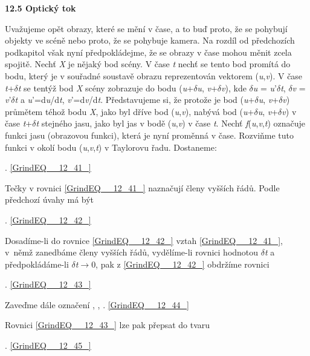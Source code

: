 \noindent 

\noindent \textbf{12.5  Optický tok}

\noindent Uvažujeme opět obrazy, které se mění v čase, a to buď proto, že se pohybují objekty ve scéně nebo proto, že se pohybuje kamera. Na rozdíl od předchozích podkapitol však nyní předpokládejme, že se obrazy v čase mohou měnit zcela spojitě. Nechť \textit{X} je nějaký bod scény. V čase \textit{t} nechť se tento bod promítá do bodu, který je v souřadné soustavě obrazu reprezentován vektorem (\textit{u},\textit{v}). V čase \textit{t}+$\delta$\textit{t} se tentýž bod \textit{X} scény zobrazuje do bodu (\textit{u}+$\delta$\textit{u}, \textit{v}+$\delta$\textit{v}), kde $\delta$\textit{u} = \textit{u}'$\delta$\textit{t}, $\delta$\textit{v} = \textit{v}'$\delta$\textit{t} a \textit{u}'=d\textit{u}/d\textit{t}, \textit{v}'=d\textit{v}/d\textit{t}. Představujeme si, že protože je bod (\textit{u}+$\delta$\textit{u}, \textit{v}+$\delta$\textit{v}) průmětem téhož bodu \textit{X}, jako byl dříve bod (\textit{u},\textit{v}), nabývá bod (\textit{u}+$\delta$\textit{u}, \textit{v}+$\delta$\textit{v}) v čase \textit{t}+$\delta$\textit{t} stejného jasu, jako byl jas v bodě (\textit{u},\textit{v}) v čase \textit{t}. Nechť \textit{f}(\textit{u},\textit{v},\textit{t}) označuje funkci jasu (obrazovou funkci), která je nyní proměnná v čase. Rozviňme tuto funkci v okolí bodu (\textit{u},\textit{v},\textit{t}) v Taylorovu řadu. Dostaneme:

  . \eqref{GrindEQ__12_41_}

\noindent Tečky v rovnici \eqref{GrindEQ__12_41_} naznačují členy vyšších řádů. Podle předchozí úvahy má být

  . \eqref{GrindEQ__12_42_}

\noindent Dosadíme-li do rovnice \eqref{GrindEQ__12_42_} vztah \eqref{GrindEQ__12_41_}, v~němž zanedbáme členy vyšších řádů, vydělíme-li rovnici hodnotou $\delta$\textit{t} a předpokládáme-li $\delta$\textit{t}$\rightarrow$0, pak z \eqref{GrindEQ__12_42_} obdržíme rovnici

 . \eqref{GrindEQ__12_43_}

\noindent Zaveďme dále označení ,   ,   . \eqref{GrindEQ__12_44_}

\noindent Rovnici \eqref{GrindEQ__12_43_} lze pak přepsat do tvaru

 . \eqref{GrindEQ__12_45_}

